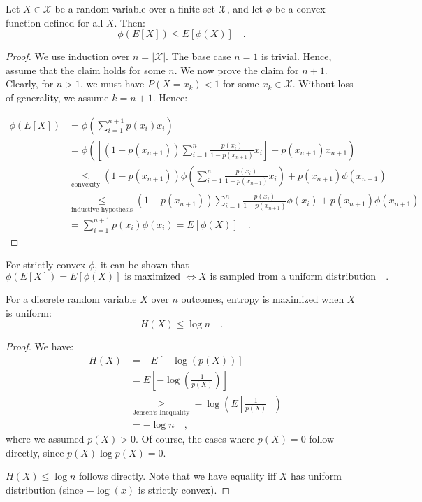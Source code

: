 \documentclass[../../main.tex]{subfiles}
\begin{document}
\begin{lemma}
    Let $X \in \mathcal{X}$ be a random variable over a finite set $\mathcal{X}$, and let $\phi$ be a convex function defined for all $X$. Then:
    \[
        \phi(E[X]) \leq E[\phi(X)] \quad .
    \]
\end{lemma}
\begin{proof}
    We use induction over $n = |\mathcal{X}|$. The base case $n = 1$ is trivial. Hence, assume that the claim holds for some $n$. We now prove the claim for $n + 1$. Clearly, for $n > 1$, we must have $P(X = x_k) < 1$ for some $x_k \in \mathcal{X}$. Without loss of generality, we assume $k = n+1$. Hence:

    \begin{align*}
        \phi(E[X]) &= \phi \left( \sum_{i = 1}^{n+1} p(x_i) x_i \right) \\
        &= \phi \left( \left[ (1 - p(x_{n+1})) \sum_{i = 1}^{n} \frac{p(x_i)}{1 - p(x_{n+1})} x_i \right] + p(x_{n+1}) x_{n+1} \right) \\
        &\underset{\text{convexity}}{\leq} (1 - p(x_{n+1})) \phi \left( \sum_{i = 1}^{n} \frac{p(x_i)}{1 - p(x_{n+1})} x_i \right) + p(x_{n+1}) \phi(x_{n+1}) \\
        &\underset{\text{inductive hypothesis}}{\leq} (1 - p(x_{n+1})) \sum_{i = 1}^{n} \frac{p(x_i)}{1 - p(x_{n+1})} \phi(x_i) + p(x_{n+1}) \phi(x_{n+1}) \\
        &= \sum_{i = 1}^{n+1} p(x_i) \phi(x_i) = E[\phi(X)] \quad .
    \end{align*}
\end{proof}

\begin{remark}
    For strictly convex $\phi$, it can be shown that
    \[
        \phi(E[X]) = E[\phi(X)] \text{ is maximized } \iff X \text{ is sampled from a uniform distribution} \quad .
    \]
\end{remark}

\pagebreak
\begin{proposition}
    For a discrete random variable \( X \) over \( n \) outcomes, entropy is maximized when \( X \) is uniform:
    \[
        H(X) \leq \log n \quad .
    \]
\end{proposition}
\begin{proof}
    We have:
    \begin{align*}
        -H(X) &= -E[-\log(p(X))] \\
        &= E \left[ -\log \left( \frac{1}{p(X)} \right)  \right] \\
        &\underset{\text{Jensen's Inequality}}{\geq} -\log \left( E \left[ \frac{1}{p(X)} \right] \right) \\
        &= -\log n \quad ,
    \end{align*}
    where we assumed $p(X) > 0$. Of course, the cases where $p(X) = 0$ follow directly, since $p(X) \log p(X) = 0$.
    
    $H(X) \leq \log n$ follows directly. Note that we have equality iff $X$ has uniform distribution (since $-\log(x)$ is strictly convex).
\end{proof}
\end{document}
